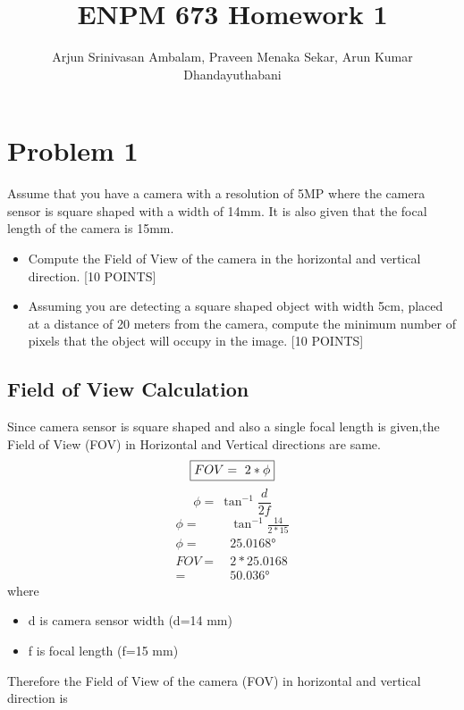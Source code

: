 \documentclass{article}
\title{ENPM 673 Homework 1}
\author{Arjun Srinivasan Ambalam, Praveen Menaka Sekar, Arun Kumar Dhandayuthabani}
\begin{document}
\maketitle

\section{Problem 1}
Assume that you have a camera with a resolution of 5MP where the camera sensor is square shaped with a width of 14mm. It is also given that the focal length of the camera is 15mm.
\begin{itemize}
\item Compute the Field of View of the camera in the horizontal and vertical direction. [10 POINTS]
\item Assuming you are detecting a square shaped object with width 5cm, placed at a distance of 20 meters from the camera, compute the minimum number of pixels that the object will occupy in the image. [10 POINTS]
\end{itemize}
\subsection{Field of View Calculation}
Since camera sensor is square shaped and also a single focal length is given,the Field of View (FOV) in Horizontal and Vertical directions are same.
\begin{equation}
\boxed{FOV =\ 2*\phi} \\
\end{equation}
\begin{equation}
\boxed{\phi = \ \tan ^{-1} \frac{d}{2f}}
\end{equation}
\begin{align*}
\phi =& \ \tan ^{ - 1}\frac{14}{2*15} \\
\phi =& \ \ang{25.0168}\\
FOV =& \ 2*25.0168 \\ =& \ \ang{50.036}
\end{align*}
where 
\begin{itemize}
\item d is camera sensor width (d=14 mm)
\item f is focal length (f=15 mm)
\end{itemize}
Therefore the Field of View of the camera (FOV) in horizontal and vertical direction is 

\end{document}

